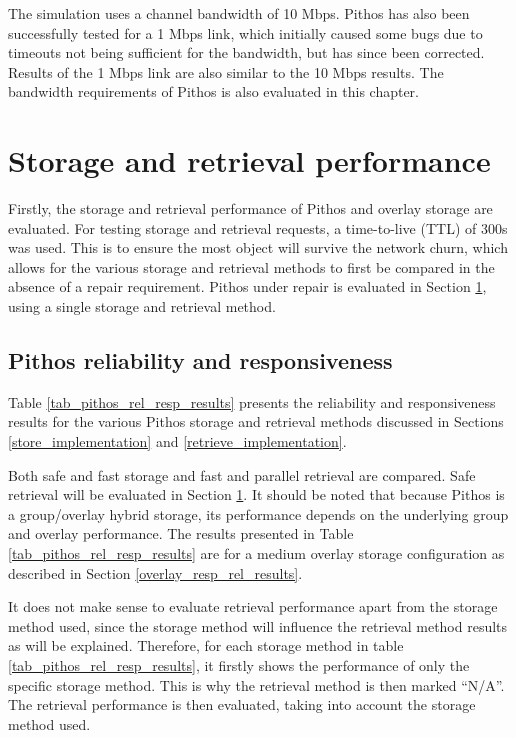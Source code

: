 The simulation uses a channel bandwidth of 10 Mbps. Pithos has also been successfully tested for a 1 Mbps link, which initially caused some bugs due to timeouts not being sufficient for the bandwidth, but has since been corrected. Results of the 1 Mbps link are also similar to the 10 Mbps results. The bandwidth requirements of Pithos is also evaluated in this chapter.

\section{Storage and retrieval performance}

Firstly, the storage and retrieval performance of Pithos and overlay storage are evaluated. For testing storage and retrieval requests, a time-to-live (TTL) of 300s was used. This is to ensure the most object will survive the network churn, which allows for the various storage and retrieval methods to first be compared in the absence of a repair requirement. Pithos under repair is evaluated in Section \ref{}, using a single storage and retrieval method.

\subsection{Pithos reliability and responsiveness}
\label{pithos_resp_rel_results}

Table \ref{tab_pithos_rel_resp_results} presents the reliability and responsiveness results for the various Pithos storage and retrieval methods discussed in Sections \ref{store_implementation} and \ref{retrieve_implementation}.

Both safe and fast storage and fast and parallel retrieval are compared. Safe retrieval will be evaluated in Section \ref{}. It should be noted that because Pithos is a group/overlay hybrid storage, its performance depends on the underlying group and overlay performance. The results presented in Table \ref{tab_pithos_rel_resp_results} are for a medium overlay storage configuration as described in Section \ref{overlay_resp_rel_results}.

It does not make sense to evaluate retrieval performance apart from the storage method used, since the storage method will influence the retrieval method results as will be explained. Therefore, for each storage method in table \ref{tab_pithos_rel_resp_results}, it firstly shows the performance of only the specific storage method. This is why the retrieval method is then marked ``N/A''. The retrieval performance is then evaluated, taking into account the storage method used.

